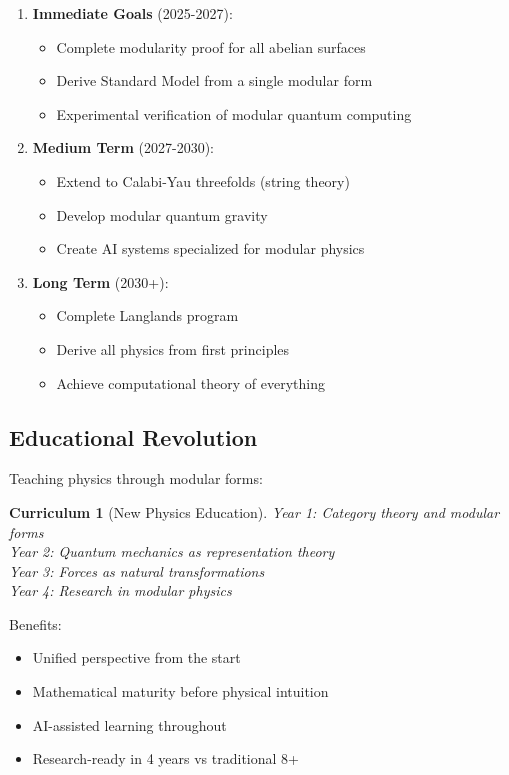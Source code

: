 \documentclass[12pt,a4paper]{article}
\newtheorem{curriculum}[theorem]{Curriculum}
\begin{document}
\begin{enumerate}
\item \textbf{Immediate Goals} (2025-2027):
\begin{itemize}
\item Complete modularity proof for all abelian surfaces
\item Derive Standard Model from a single modular form
\item Experimental verification of modular quantum computing
\end{itemize}

\item \textbf{Medium Term} (2027-2030):
\begin{itemize}
\item Extend to Calabi-Yau threefolds (string theory)
\item Develop modular quantum gravity
\item Create AI systems specialized for modular physics
\end{itemize}

\item \textbf{Long Term} (2030+):
\begin{itemize}
\item Complete Langlands program
\item Derive all physics from first principles
\item Achieve computational theory of everything
\end{itemize}
\end{enumerate}

\subsection{Educational Revolution}

Teaching physics through modular forms:

\begin{curriculum}[New Physics Education]
Year 1: Category theory and modular forms \\
Year 2: Quantum mechanics as representation theory \\
Year 3: Forces as natural transformations \\
Year 4: Research in modular physics
\end{curriculum}

Benefits:
\begin{itemize}
\item Unified perspective from the start
\item Mathematical maturity before physical intuition
\item AI-assisted learning throughout
\item Research-ready in 4 years vs traditional 8+
\end{itemize}
\end{document}
